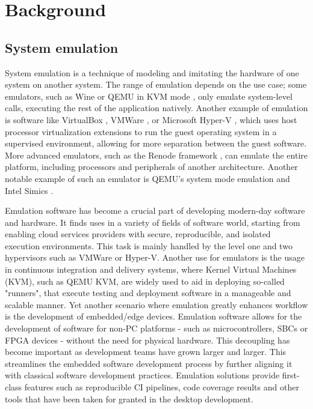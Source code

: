 
\chapter{Background}


\section{System emulation}

System emulation is a technique of modeling and imitating the hardware of one system on another system. The range of emulation depends on the use case; some emulators, such as Wine \cite{Wine}
or QEMU in KVM mode \cite{QemuKVM}, only emulate system-level calls, executing the rest of the application natively. Another example of emulation is software like VirtualBox \cite{VirtualBox}, VMWare \cite{VMWareWorkstation}, or Microsoft
Hyper-V \cite{hyperv}, which uses host processor virtualization extensions to run the guest operating system in a supervised environment, allowing for more separation between the guest software.
More advanced emulators, such as the Renode framework \cite{Renode}, can emulate the entire platform, including processors and peripherals of another architecture. Another notable example of
such an emulator is QEMU's system mode emulation \cite{Qemu} and Intel Simics \cite{simics}.

Emulation software has become a crucial part of developing modern-day software and hardware. It finds uses in a variety of fields of software world, starting from enabling cloud
services providers with secure, reproducible, and isolated execution environments. This task is mainly handled by the level one and two hypervisors such as VMWare or Hyper-V.
Another use for emulators is the usage in continuous integration and delivery systems, where Kernel Virtual Machines (KVM), such as QEMU KVM, are widely used to aid in deploying
so-called "runners", that execute testing and deployment software in a manageable and scalable manner. Yet another scenario where emulation greatly enhances workflow is the
development of embedded/edge devices. Emulation software allows for the development of software for non-PC platforms - such as microcontrollers, SBCs or FPGA devices - without the
need for physical hardware. This decoupling has become important as development teams have grown larger and larger. This streamlines the embedded software development process by
further aligning it with classical software development practices. Emulation solutions provide first-class features such as reproducible CI pipelines, code coverage results and
other tools that have been taken for granted in the desktop development.
%

